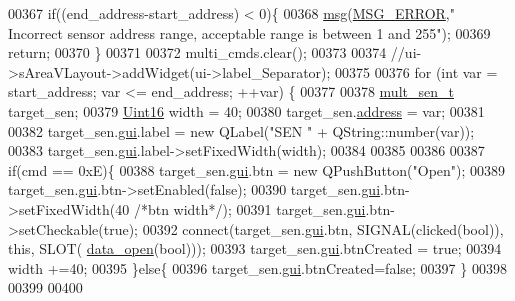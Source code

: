\begin{DoxyCode}
00367           \textcolor{keywordflow}{if}((end\_address-start\_address) < 0)\{
00368               \hyperlink{a00017_a6134b74dbfffbaf333e169bd09597b53}{msg}(\hyperlink{a00090_aa8a990825a5a62c89d2fb8b08d8a1070}{MSG\_ERROR},\textcolor{stringliteral}{"  Incorrect sensor address range, acceptable range is between 1
       and 255"});
00369              \textcolor{keywordflow}{return};
00370           \}
00371 
00372           multi\_cmds.clear();
00373 
00374           \textcolor{comment}{//ui->sAreaVLayout->addWidget(ui->label\_Separator);}
00375 
00376           \textcolor{keywordflow}{for} (\textcolor{keywordtype}{int} var = start\_address; var <= end\_address; ++var) \{
00377 
00378            \hyperlink{a00004_d9/d90/a00178}{mult\_sen\_t} target\_sen;
00379            \hyperlink{a00004_aae7407b021d43f7193a81a58cfb3e297}{Uint16} width = 40;                   
00380            target\_sen.\hyperlink{a00004_acc8ad431836f7b42742eda4fd49385b2}{address} = var;
00381 
00382            target\_sen.\hyperlink{a00004_a7758f566562596be39abf215046e32f0}{gui}.label = \textcolor{keyword}{new} QLabel(\textcolor{stringliteral}{"SEN "} + QString::number(var));
00383            target\_sen.\hyperlink{a00004_a7758f566562596be39abf215046e32f0}{gui}.label->setFixedWidth(width);
00384 
00385 
00386 
00387            \textcolor{keywordflow}{if}(cmd == 0xE)\{
00388            target\_sen.\hyperlink{a00004_a7758f566562596be39abf215046e32f0}{gui}.btn = \textcolor{keyword}{new} QPushButton(\textcolor{stringliteral}{"Open"});
00389            target\_sen.\hyperlink{a00004_a7758f566562596be39abf215046e32f0}{gui}.btn->setEnabled(\textcolor{keyword}{false});
00390            target\_sen.\hyperlink{a00004_a7758f566562596be39abf215046e32f0}{gui}.btn->setFixedWidth(40 \textcolor{comment}{/*btn width*/});
00391            target\_sen.\hyperlink{a00004_a7758f566562596be39abf215046e32f0}{gui}.btn->setCheckable(\textcolor{keyword}{true});
00392            connect(target\_sen.\hyperlink{a00004_a7758f566562596be39abf215046e32f0}{gui}.btn, SIGNAL(clicked(\textcolor{keywordtype}{bool})), \textcolor{keyword}{this}, SLOT(
      \hyperlink{a00017_a35b895072769864ac42f8cd732267e4b}{data\_open}(\textcolor{keywordtype}{bool})));
00393            target\_sen.\hyperlink{a00004_a7758f566562596be39abf215046e32f0}{gui}.btnCreated = \textcolor{keyword}{true};
00394            width +=40;
00395            \}\textcolor{keywordflow}{else}\{
00396                target\_sen.\hyperlink{a00004_a7758f566562596be39abf215046e32f0}{gui}.btnCreated=\textcolor{keyword}{false};
00397            \}
00398 
00399 
00400 

\end{DoxyCode}
